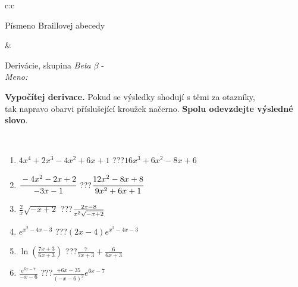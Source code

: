 \documentclass[10pt]{report}
\begin{document}
\begin{tabular}{c:c}
\begin{minipage}[c][104.5mm][t]{0.5\linewidth}
\begin{center}
\begin{minipage}{0.20\linewidth}
\begin{center}
{\small Písmeno Braillovej abecedy}
\end{center}
\end{minipage}
\end{center}
\end{minipage}
&
\begin{minipage}[c][104.5mm][t]{0.5\linewidth}
\begin{center}
\vspace{7mm}
{\huge Derivácie, skupina \textit{Beta $\beta$} -}\\[5mm]
\textit{Meno:}\phantom{xxxxxxxxxxxxxxxxxxxxxxxxxxxxxxxxxxxxxxxxxxxxxxxxxxxxxxxxxxxxxxxxx}\\[5mm]
\begin{minipage}{0.95\linewidth}
\begin{center}
\textbf{Vypočítej derivace.} Pokud se výsledky shodují s těmi za otazníky,\\tak napravo obarvi příslušející kroužek načerno. \textbf{Spolu odevzdejte výsledné slovo}.
\end{center}
\end{minipage}
\\[1mm]
\begin{minipage}{0.79\linewidth}
\begin{center}
\begin{varwidth}{\linewidth}
\begin{enumerate}
\normalsize
\item $4x^4+2x^3-4x^2+6x+1$\quad \dotfill\; ???\;\dotfill \quad $16x^3+6x^2-8x+6$
\item $\cfrac{-4x^2-2x+2}{-3x-1}$\quad \dotfill\; ???\;\dotfill \quad $\cfrac{12x^2-8x+8}{9x^2+6x+1}$
\item $\frac{2}{x}\sqrt{-x+2}$\quad \dotfill\; ???\;\dotfill \quad $\frac{2x-8}{x^2 \sqrt{\smash[b]{-x+2}}}$
\item $e^{x^2-4x-3}$\quad \dotfill\; ???\;\dotfill \quad $(2x-4)e^{x^2-4x-3}$
\item $\ln{\left(\frac{7x+3}{6x+3}\right)}$\quad \dotfill\; ???\;\dotfill \quad $\frac{7}{7x+3}+\frac{6}{6x+3}$
\item $\frac{e^{6x-7}}{-x-6}$\quad \dotfill\; ???\;\dotfill \quad $\frac{+6x-35}{(-x-6)^2}e^{6x-7}$
\end{enumerate}
\end{varwidth}
\end{center}
\end{minipage}
\begin{minipage}{0.20\linewidth}
\begin{center}

\end{center}
\end{minipage}
\end{center}
\end{minipage}
\end{tabular}
\end{document}
